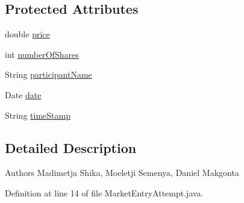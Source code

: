 \subsection*{Protected Attributes}
\begin{DoxyCompactItemize}
\item 
double \hyperlink{classfinancialmarketsimulator_1_1_market_entry_attempt_a6e3074ceef1578108b239a355b0a6747}{price}
\item 
int \hyperlink{classfinancialmarketsimulator_1_1_market_entry_attempt_a5333f3fb0b26cba3382a05e582f86d8a}{number\+Of\+Shares}
\item 
String \hyperlink{classfinancialmarketsimulator_1_1_market_entry_attempt_a3b4418b6906b72597b72ec50a245afce}{participant\+Name}
\item 
Date \hyperlink{classfinancialmarketsimulator_1_1_market_entry_attempt_a7dcd3bab8cbe1498e452bec851e5ec5d}{date}
\item 
String \hyperlink{classfinancialmarketsimulator_1_1_market_entry_attempt_acd62492a481b9db42703ce1c60a01ff3}{time\+Stamp}
\end{DoxyCompactItemize}


\subsection{Detailed Description}
\begin{DoxyAuthor}{Authors}
Madimetja Shika, Moeletji Semenya, Daniel Makgonta 
\end{DoxyAuthor}


Definition at line 14 of file Market\+Entry\+Attempt.\+java.



